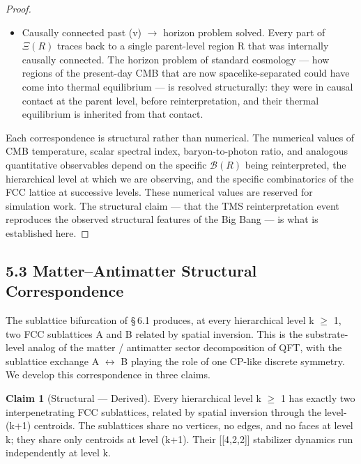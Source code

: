 \documentclass[11pt,oneside]{report}
\theoremstyle{definition}
\newtheorem{claim}[theorem]{Claim}
\theoremstyle{remark}
\begin{document}
\begin{proof}
\begin{itemize}
\item
  Causally connected past (v) \ensuremath{\to} horizon problem solved. Every part of
  \ensuremath{\Xi (R)} traces back to a single parent-level region R that was internally
  causally connected. The horizon problem of standard cosmology --- how
  regions of the present-day CMB that are now spacelike-separated could
  have come into thermal equilibrium --- is resolved structurally: they
  were in causal contact at the parent level, before reinterpretation,
  and their thermal equilibrium is inherited from that contact.
\end{itemize}

Each correspondence is structural rather than numerical. The numerical
values of CMB temperature, scalar spectral index, baryon-to-photon
ratio, and analogous quantitative observables depend on the specific
\ensuremath{\mathcal{B}(R)} being reinterpreted, the hierarchical level at which we are
observing, and the specific combinatorics of the FCC lattice at
successive levels. These numerical values are reserved for simulation
work. The structural claim --- that the TMS reinterpretation event
reproduces the observed structural features of the Big Bang --- is what
is established here.

\end{proof}

\subsection*{5.3 Matter--Antimatter Structural Correspondence}

The sublattice bifurcation of \S\,6.1 produces, at every hierarchical level
k \ensuremath{\geq} 1, two FCC sublattices A and B related by spatial inversion. This is
the substrate-level analog of the matter / antimatter sector
decomposition of QFT, with the sublattice exchange A \ensuremath{\leftrightarrow} B playing the
role of one CP-like discrete symmetry. We develop this correspondence in
three claims.

\begin{claim}[Structural --- Derived]
Every hierarchical
level k \ensuremath{\geq} 1 has exactly two interpenetrating FCC sublattices, related by
spatial inversion through the level-(k+1) centroids. The sublattices
share no vertices, no edges, and no faces at level k; they share only
centroids at level (k+1). Their [[4,2,2]] stabilizer dynamics
run independently at level k.
\end{claim}
\end{document}
